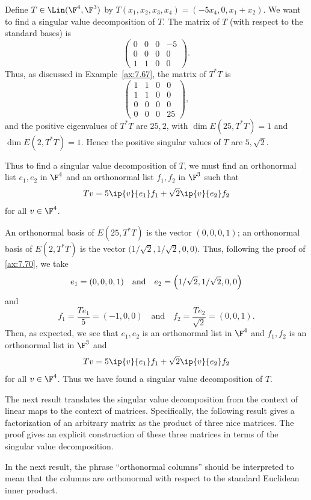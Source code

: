 \begin{example}\label{ax:7.79}
Define $T\in\Lin(\F^4,\F^3)$ by $T(x_1,x_2,x_3,x_4)=(-5x_4,0,x_1+x_2)$. We want
to find a singular value decomposition of $T$. The matrix of $T$ (with respect
to the standard bases) is
\[ \begin{pmatrix} 0&0&0&-5\\ 0&0&0&0\\ 1&1&0&0 \end{pmatrix}. \]
Thus, as discussed in Example~\ref{ax:7.67}, the matrix of $T^*T$ is
\[ \begin{pmatrix} 1&1&0&0\\ 1&1&0&0\\ 0&0&0&0\\ 0&0&0&25 \end{pmatrix}, \]
and the positive eigenvalues of $T^*T$ are $25,2$, with
$\dim E(25,T^*T)=\allowbreak1$ and $\dim E(2,T^*T)=1$. Hence the positive singular values of $T$ are
$5,\sqrt2$.

Thus to find a singular value decomposition of $T$, we must find an
orthonormal list $e_1,e_2$ in $\F^4$ and an orthonormal list $f_1,f_2$ in
$\F^3$ such that
\[ Tv = 5\ip{v}{e_1}f_1+\sqrt2\ip{v}{e_2}f_2 \]
for all $v\in\F^4$.

An orthonormal basis of $E(25,T^*T)$ is the vector $(0,0,0,1)$; an orthonormal
basis of $E(2,T^*T)$ is the vector
$\bigl(1/\sqrt2,1/\sqrt2,0,0\bigr)$. Thus, following the proof
of \ref{ax:7.70}, we take
\[ e_1=(0,0,0,1) \quad\text{and}\quad
   e_2=\Bigl(1/\sqrt2,1/\sqrt2,0,0\Bigr) \]
and
\[ f_1=\frac{Te_1}{5}=(-1,0,0) \quad\text{and}\quad
   f_2=\frac{Te_2}{\sqrt2}=(0,0,1). \]
Then, as expected, we see that $e_1,e_2$ is an orthonormal list in $\F^4$ and
$f_1,f_2$ is an orthonormal list in $\F^3$ and
\[ Tv = 5\ip{v}{e_1}f_1+\sqrt2\ip{v}{e_2}f_2 \]
for all $v\in\F^4$. Thus we have found a singular value decomposition of $T$.
\end{example}

The next result translates the singular value decomposition from the context
of linear maps to the context of matrices. Specifically, the following result
gives a factorization of an arbitrary matrix as the product of three nice
matrices. The proof gives an explicit construction of these three matrices in
terms of the singular value decomposition.

In the next result, the phrase ``orthonormal columns'' should be interpreted to
mean that the columns are orthonormal with respect to the standard Euclidean
inner product.


